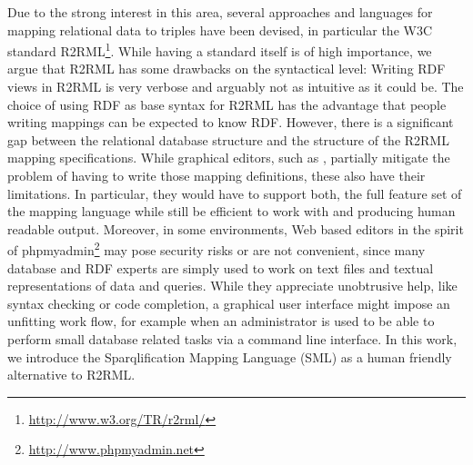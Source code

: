 Due to the strong interest in this area, several approaches and languages for mapping relational data to triples have been devised, in particular the W3C standard R2RML\footnote{\url{http://www.w3.org/TR/r2rml/}}.
While having a standard itself is of high importance, we argue that R2RML has some drawbacks on the syntactical level:
Writing RDF views in R2RML is very verbose and arguably not as intuitive as it could be.
The choice of using RDF as base syntax for R2RML has the advantage that people writing mappings can be expected to know RDF.
However, there is a significant gap between the relational database structure and the structure of the R2RML mapping specifications.
While graphical editors, such as \cite{sengupta2013editing}\cite{pinkel2014partner}, partially mitigate the problem of having to write those mapping definitions, these also have their limitations.
In particular, they would have to support both, the full feature set of the mapping language while still be efficient to work with and producing human readable output.
Moreover, in some environments, Web based editors in the spirit of phpmyadmin\footnote{\url{http://www.phpmyadmin.net}} may pose security risks or are not convenient, since many database and RDF experts are simply used to work on text files and textual representations of data and queries.
While they appreciate unobtrusive help, like syntax checking or code completion, a graphical user interface might impose an unfitting work flow, for example when an administrator is used to be able to perform small database related tasks via a command line interface.
In this work, we introduce the Sparqlification Mapping Language (SML) as a human friendly alternative to R2RML.
